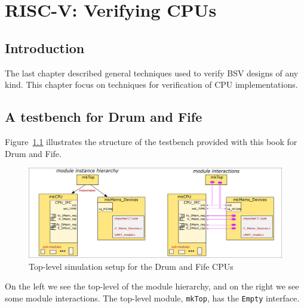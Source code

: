 

\chapter{RISC-V: Verifying CPUs}


\setcounter{page}{1}
\renewcommand{\thepage}{\arabic{chapter}-\arabic{page}}

\label{ch_RISCV_verification}


\section{Introduction}

The last chapter described general techniques used to verify BSV
designs of any kind.  This chapter focus on techniques for
verification of CPU implementations.


\section{A testbench for Drum and Fife}

Figure~\ref{Fig_CPU_Simulation} illustrates the structure of the
testbench provided with this book for Drum and Fife.
\begin{figure}[htbp]
  \centerline{\includegraphics[width=6in,angle=0]{Figures/Fig_CPU_Simulation}}
  \caption{\label{Fig_CPU_Simulation}
           Top-level simulation setup for the Drum and Fife CPUs}
\end{figure}
On the left we see the top-level of the module hierarchy, and on the
right we see some module interactions.  The top-level module,
\verb|mkTop|, has the \verb|Empty| interface.

